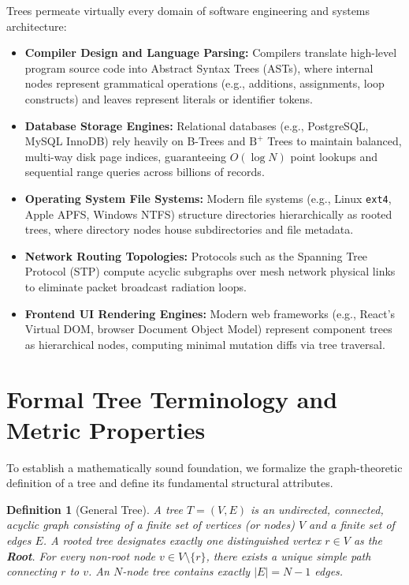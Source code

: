 \documentclass[10pt,journal,compsoc,onecolumn]{IEEEtran}
\newtheorem{definition}[theorem]{Definition}
\begin{document}
Trees permeate virtually every domain of software engineering and systems architecture:
\begin{itemize}
    \item \textbf{Compiler Design and Language Parsing:} Compilers translate high-level program source code into Abstract Syntax Trees (ASTs), where internal nodes represent grammatical operations (e.g., additions, assignments, loop constructs) and leaves represent literals or identifier tokens.
    \item \textbf{Database Storage Engines:} Relational databases (e.g., PostgreSQL, MySQL InnoDB) rely heavily on B-Trees and $\text{B}^+$ Trees to maintain balanced, multi-way disk page indices, guaranteeing $O(\log N)$ point lookups and sequential range queries across billions of records.
    \item \textbf{Operating System File Systems:} Modern file systems (e.g., Linux \texttt{ext4}, Apple APFS, Windows NTFS) structure directories hierarchically as rooted trees, where directory nodes house subdirectories and file metadata.
    \item \textbf{Network Routing Topologies:} Protocols such as the Spanning Tree Protocol (STP) compute acyclic subgraphs over mesh network physical links to eliminate packet broadcast radiation loops.
    \item \textbf{Frontend UI Rendering Engines:} Modern web frameworks (e.g., React's Virtual DOM, browser Document Object Model) represent component trees as hierarchical nodes, computing minimal mutation diffs via tree traversal.
\end{itemize}

\section{Formal Tree Terminology and Metric Properties}
\label{sec:terminology}

To establish a mathematically sound foundation, we formalize the graph-theoretic definition of a tree and define its fundamental structural attributes.

\begin{definition}[General Tree]
A \emph{tree} $T = (V, E)$ is an undirected, connected, acyclic graph consisting of a finite set of vertices (or \emph{nodes}) $V$ and a finite set of edges $E$. A rooted tree designates exactly one distinguished vertex $r \in V$ as the \textbf{Root}. For every non-root node $v \in V \setminus \{r\}$, there exists a unique simple path connecting $r$ to $v$. An $N$-node tree contains exactly $|E| = N - 1$ edges.
\end{definition}
\end{document}
